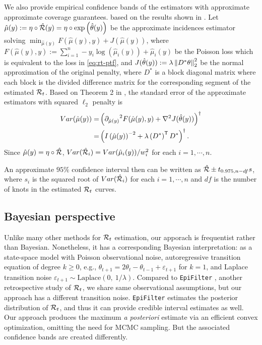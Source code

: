 We also provide empirical confidence bands of the estimators with approximate 
approximate coverage guarantees. based on the results shown in \cite{vaiter2017degrees}. 
Let $\hat{\mu}(y) := \eta\circ \hat{\mathcal{R}}(y) = \eta\circ \exp\left(\hat{\theta}(y)\right)$ 
be the approximate incidences estimator solving 
$\min_{\hat{\mu}(y)} F(\hat{\mu}(y), y) + J(\hat{\mu}(y))$, where  
$F(\hat{\mu}(y), y):=\sum_{i=1}^n -y_i \log(\hat{\mu}_i(y)) + \hat{\mu}_i(y)$ be 
the Poisson loss which is equivalent to the loss in \eqref{eq:rt-ptf}, and 
$J(\hat{\theta}(y)) := \lambda \left\lVert D^{\ast} \theta \right\rVert_2^2$ be the normal 
approximation of the original penalty, where $D^{\ast}$ is a block diagonal matrix 
where each block is the divided difference matrix for the corresponding segment of 
the estimated $\mathcal{R}_t$. Based on Theorem 2 in \cite{vaiter2017degrees}, the 
standard error of the approximate estimators with squared $\ell_2$ penalty is 
\begin{align}
  Var(\hat{\mu}(y)) =& \left( {\partial_{\hat{\mu}(y)}}^2 F(\hat{\mu}(y), y) + \nabla^2 J(\hat{\theta}(y))\right)^{\dagger} \\
  =& \left(I\left(\hat{\mu}(y)\right)^{-2} + \lambda \left(D^{\ast}\right)^{\mathsf{T}} D^{\ast}\right)^{\dagger}.
\end{align} 
Since $\hat{\mu}(y) = \eta\circ \hat{\mathcal{R}}$, $Var(\hat{\mathcal{R}}_i) = Var(\hat{\mu}_i(y)) / w_i^2$ 
for each $i = 1, \cdots, n$. 

An approximate $95\%$ confidence interval then can be written as $\hat{\mathcal{R}} \pm t_{0.975, n-df} s$, 
where $s_i$ is the squared root of $Var(\hat{\mathcal{R}}_i)$ for each $i = 1, \cdots, n$ 
and $df$ is the number of knots in the estimated $\mathcal{R}_t$ curves. 

\subsection{Bayesian perspective}

Unlike many other methods for $\mathcal{R}_t$ estimation, our apporach is frequentist
rather than Bayesian. Nonetheless, it has a corresponding Bayesian
interpretation: as a state-space model with Poisson observational noise,
autoregressive transition equation of degree $k\geq 0$, e.g., $\theta_{t+1} =
2\theta_t - \theta_{t-1} + \varepsilon_{t+1}$ for $k=1$, and Laplace transition
noise $\varepsilon_{t+1}\sim \mathrm{Laplace}(0,\ 1/\lambda)$. Compared to
\texttt{EpiFilter} \citep{parag2021improved}, another retrospective study of
$\mathcal{R}_t$, we share same observational assumptions, but our approach has a
different transition noise. \texttt{EpiFilter} estimates the posterior
distribution of
$\mathcal{R}_t$, and thus it can provide credible interval estimates as well. Our
approach produces the maximum \emph{a posteriori} estimate via an efficient
convex optimization, omitting the need for MCMC sampling. But the associated
confidence bands are created differently.
